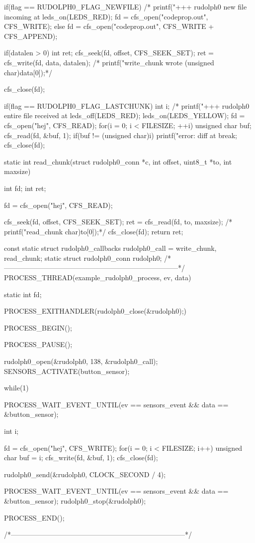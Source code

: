 \begin{DoxyCodeInclude}
{  if(flag == RUDOLPH0_FLAG_NEWFILE) {
    /*    printf("+++ rudolph0 new file incoming at %
    leds_on(LEDS_RED);
    fd = cfs_open("codeprop.out", CFS_WRITE);
  } else {
    fd = cfs_open("codeprop.out", CFS_WRITE + CFS_APPEND);
  }
  
  if(datalen > 0) {
    int ret;
    cfs_seek(fd, offset, CFS_SEEK_SET);
    ret = cfs_write(fd, data, datalen);
    /*    printf("write_chunk wrote %
       (unsigned char)data[0]);*/
  }

  cfs_close(fd);

  if(flag == RUDOLPH0_FLAG_LASTCHUNK) {
    int i;
    /*    printf("+++ rudolph0 entire file received at %
    leds_off(LEDS_RED);
    leds_on(LEDS_YELLOW);
    fd = cfs_open("hej", CFS_READ);
    for(i = 0; i < FILESIZE; ++i) {
      unsigned char buf;
      cfs_read(fd, &buf, 1);
      if(buf != (unsigned char)i) {
        printf("error: diff at %
        break;
      }
    }
    cfs_close(fd);
  }
}
static int
read_chunk(struct rudolph0_conn *c, int offset, uint8_t *to, int maxsize)
{
  int fd;
  int ret;
  
  fd = cfs_open("hej", CFS_READ);

  cfs_seek(fd, offset, CFS_SEEK_SET);
  ret = cfs_read(fd, to, maxsize);
  /*  printf("read_chunk %
       char)to[0]);*/
  cfs_close(fd);
  return ret;
}
const static struct rudolph0_callbacks rudolph0_call = {write_chunk,
                                                        read_chunk};
static struct rudolph0_conn rudolph0;
/*---------------------------------------------------------------------------*/
PROCESS_THREAD(example_rudolph0_process, ev, data)
{
  static int fd;

  PROCESS_EXITHANDLER(rudolph0_close(&rudolph0);)
      
  PROCESS_BEGIN();

  PROCESS_PAUSE();

  
  rudolph0_open(&rudolph0, 138, &rudolph0_call);
  SENSORS_ACTIVATE(button_sensor);

  while(1) {
    PROCESS_WAIT_EVENT_UNTIL(ev == sensors_event &&
                             data == &button_sensor);
    {
      int i;
      
      fd = cfs_open("hej", CFS_WRITE);
      for(i = 0; i < FILESIZE; i++) {
        unsigned char buf = i;
        cfs_write(fd, &buf, 1);
      }
      cfs_close(fd);
    }
    rudolph0_send(&rudolph0, CLOCK_SECOND / 4);

    PROCESS_WAIT_EVENT_UNTIL(ev == sensors_event &&
                             data == &button_sensor);
    rudolph0_stop(&rudolph0);

  }
  PROCESS_END();
}
/*---------------------------------------------------------------------------*/
\end{DoxyCodeInclude}
 